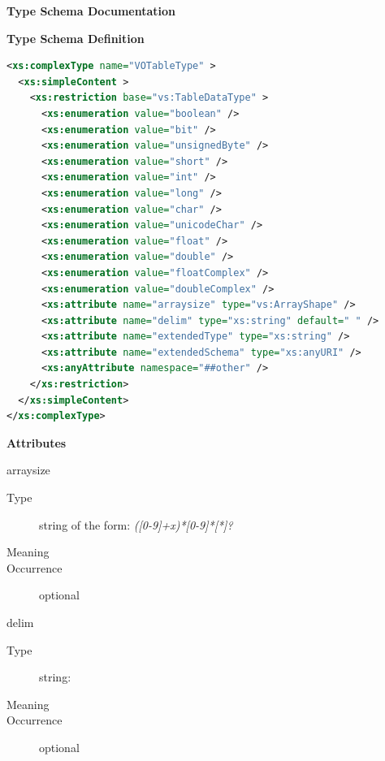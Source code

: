 \documentclass[11pt,a4paper]{ivoa}
\begin{document}
\begin{generated}
\begingroup
      	\renewcommand*\descriptionlabel[1]{%
      	\hbox to 5.5em{\emph{#1}\hfil}}\vspace{2ex}\noindent\textbf{ Type Schema Documentation}


\vspace{1ex}\noindent\textbf{ Type Schema Definition}

\begin{lstlisting}[language=XML,basicstyle=\footnotesize]
<xs:complexType name="VOTableType" >
  <xs:simpleContent >
    <xs:restriction base="vs:TableDataType" >
      <xs:enumeration value="boolean" />
      <xs:enumeration value="bit" />
      <xs:enumeration value="unsignedByte" />
      <xs:enumeration value="short" />
      <xs:enumeration value="int" />
      <xs:enumeration value="long" />
      <xs:enumeration value="char" />
      <xs:enumeration value="unicodeChar" />
      <xs:enumeration value="float" />
      <xs:enumeration value="double" />
      <xs:enumeration value="floatComplex" />
      <xs:enumeration value="doubleComplex" />
      <xs:attribute name="arraysize" type="vs:ArrayShape" />
      <xs:attribute name="delim" type="xs:string" default=" " />
      <xs:attribute name="extendedType" type="xs:string" />
      <xs:attribute name="extendedSchema" type="xs:anyURI" />
      <xs:anyAttribute namespace="##other" />
    </xs:restriction>
  </xs:simpleContent>
</xs:complexType>
\end{lstlisting}

\vspace{0.5ex}\noindent\textbf{ Attributes}

\begingroup\small\begin{bigdescription}
\item[arraysize]
\begin{description}
\item[Type] string of the form: \emph{([0-9]+x)*[0-9]*[*]?}
\item[Meaning] 
\item[Occurrence] optional

\end{description}
\item[delim]
\begin{description}
\item[Type] string: 
\item[Meaning] 
\item[Occurrence] optional
 

\end{description}
\end{bigdescription}
\end{generated}
\end{document}

